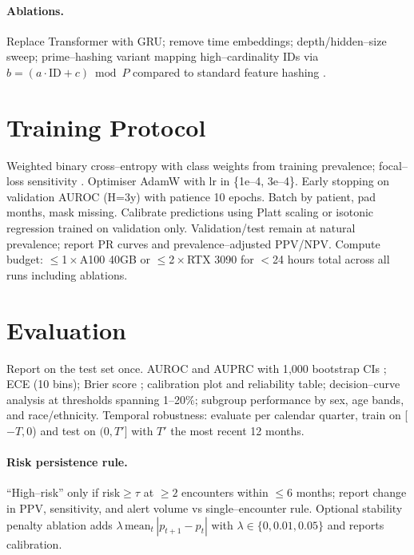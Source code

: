 \documentclass[11pt]{article}
\begin{document}
\paragraph{Ablations.} Replace Transformer with GRU; remove time embeddings; depth/hidden--size sweep; prime--hashing variant mapping high--cardinality IDs via $b=(a\cdot\mathrm{ID}+c)\bmod P$ compared to standard feature hashing \citep{weinberger2009feature}.

\section{Training Protocol}
Weighted binary cross--entropy with class weights from training prevalence; focal--loss sensitivity \citep{lin2017focal}. Optimiser AdamW \citep{loshchilov2019adamw} with lr in \{1e--4, 3e--4\}. Early stopping on validation AUROC (H=3y) with patience 10 epochs. Batch by patient, pad months, mask missing. Calibrate predictions using Platt scaling \citep{platt1999probabilistic} or isotonic regression \citep{zadrozny2002transforming} trained on validation only. Validation/test remain at natural prevalence; report PR curves and prevalence--adjusted PPV/NPV. Compute budget: $\le$1\,$\times$\,A100 40GB or $\le$2\,$\times$\,RTX 3090 for $<$24 hours total across all runs including ablations.

\section{Evaluation}
Report on the test set once. AUROC and AUPRC with 1{,}000 bootstrap CIs \citep{efron1979bootstrap}; ECE (10 bins); Brier score \citep{brier1950verification}; calibration plot and reliability table; decision--curve analysis \citep{vickers2006decision} at thresholds spanning 1--20\%; subgroup performance by sex, age bands, and race/ethnicity. Temporal robustness: evaluate per calendar quarter, train on [$-T,0$) and test on $(0,T']$ with $T'$ the most recent 12 months. 

\paragraph{Risk persistence rule.} ``High--risk'' only if risk$\ge\tau$ at $\ge2$ encounters within $\le6$ months; report change in PPV, sensitivity, and alert volume vs single--encounter rule. Optional stability penalty ablation adds $\lambda\,\mathrm{mean}_t\,|p_{t+1}-p_t|$ with $\lambda\in\{0,0.01,0.05\}$ and reports calibration.
\end{document}
